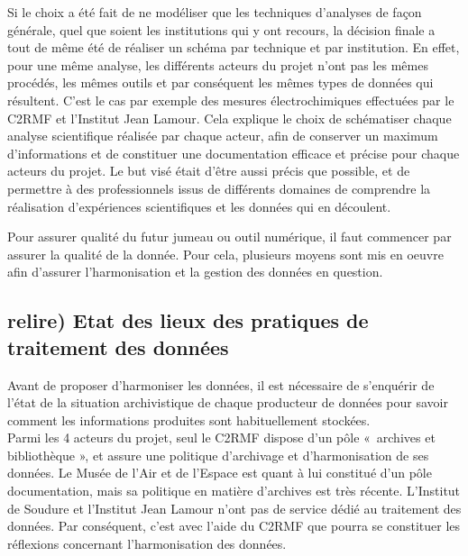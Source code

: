 Si le choix a été fait de ne modéliser que les techniques d’analyses de façon générale, quel que soient les institutions qui y ont recours, la décision finale a tout de même été de réaliser un schéma par technique et par institution. En effet, pour une même analyse, les différents acteurs du projet n’ont pas les mêmes procédés, les mêmes outils et par conséquent les mêmes types de données qui résultent. C’est le cas par exemple des mesures électrochimiques effectuées par le C2RMF et l'Institut Jean Lamour. Cela explique le choix de schématiser chaque analyse scientifique réalisée par chaque acteur, afin de conserver un maximum d'informations et de constituer une documentation efficace et précise pour chaque acteurs du projet. Le but visé était d’être aussi précis que possible, et de permettre à des professionnels issus de différents domaines de comprendre la réalisation d’expériences scientifiques et les données qui en découlent. 


Pour assurer qualité du futur jumeau ou outil numérique, il faut commencer par assurer la qualité de la donnée. Pour cela, plusieurs moyens sont mis en oeuvre afin d'assurer l'harmonisation et la gestion des données en question.

        \subsection{relire) Etat des lieux des pratiques de traitement des données}

Avant de proposer d’harmoniser les données, il est nécessaire de s’enquérir de l'état de la situation archivistique de chaque producteur de données pour savoir comment les informations produites sont habituellement stockées.\\

Parmi les 4 acteurs du projet, seul le C2RMF dispose d'un pôle « archives et bibliothèque », et assure une politique d’archivage et d’harmonisation de ses données. Le Musée de l'Air et de l'Espace est quant à lui constitué d'un pôle documentation, mais sa politique en matière d'archives est très récente. L'Institut de Soudure et l’Institut Jean Lamour n'ont pas de service dédié au traitement des données. Par conséquent, c'est avec l'aide du C2RMF que pourra se constituer les réflexions concernant l'harmonisation des données.\\

